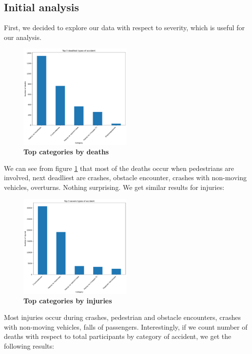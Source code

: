 \subsection{Initial analysis}
First, we decided to explore our data with respect to severity, which is useful for our analysis.
\begin{figure}[htpb!]
	\centering
	\includegraphics[width=0.5\textwidth, scale=0.4]{../imgs/pdf_files/top5deaths.pdf}
	\caption{\textbf{Top categories by deaths}}
	\label{fig:top5d}
\end{figure}
We can see from figure \ref{fig:top5d} that most of the deaths occur when pedestrians are involved, next deadliest are crashes, obstacle encounter,
crashes with non-moving vehicles, overturns. Nothing surprising. We get similar results for injuries:
\begin{figure}[H]
	\centering
	\includegraphics[width=0.5\textwidth, scale=0.4]{../imgs/pdf_files/top5injuries.pdf}
	\caption{\textbf{Top categories by injuries}}
	\label{fig:top5inj}
\end{figure}
\noindent
 Most injuries occur during crashes, pedestrian and obstacle encounters, crashes with non-moving vehicles,
falls of passengers.
Interestingly, if we count number of deaths with respect to total participants by category of accident, we get the following results:
